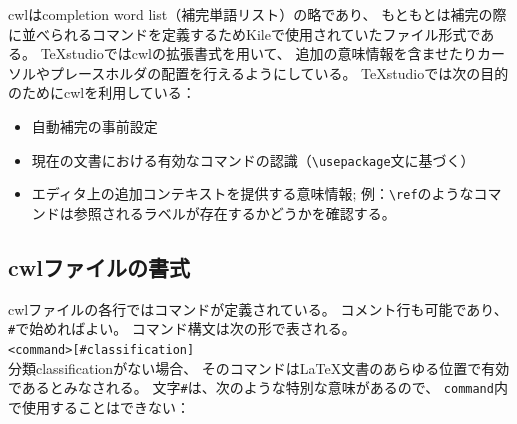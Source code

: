 cwlはcompletion word list（補完単語リスト）の略であり、
もともとは補完の際に並べられるコマンドを定義するためKileで使用されていたファイル形式である。
TeXstudioではcwlの拡張書式を用いて、
追加の意味情報を含ませたりカーソルやプレースホルダの配置を行えるようにしている。
TeXstudioでは次の目的のためにcwlを利用している：

\begin{itemize}
\item
  自動補完の事前設定
\item
  現在の文書における有効なコマンドの認識（\verb+\usepackage+文に基づく）
\item
  エディタ上の追加コンテキストを提供する意味情報;
  例：\verb+\ref+のようなコマンドは参照されるラベルが存在するかどうかを確認する。
\end{itemize}

\subsection{cwlファイルの書式}

cwlファイルの各行ではコマンドが定義されている。
コメント行も可能であり、\verb+#+で始めればよい。
コマンド構文は次の形で表される。\\

\verb+<command>[#classification]+\\

分類classificationがない場合、
そのコマンドはLaTeX文書のあらゆる位置で有効であるとみなされる。
文字\verb+#+は、次のような特別な意味があるので、
\verb+command+内で使用することはできない：

